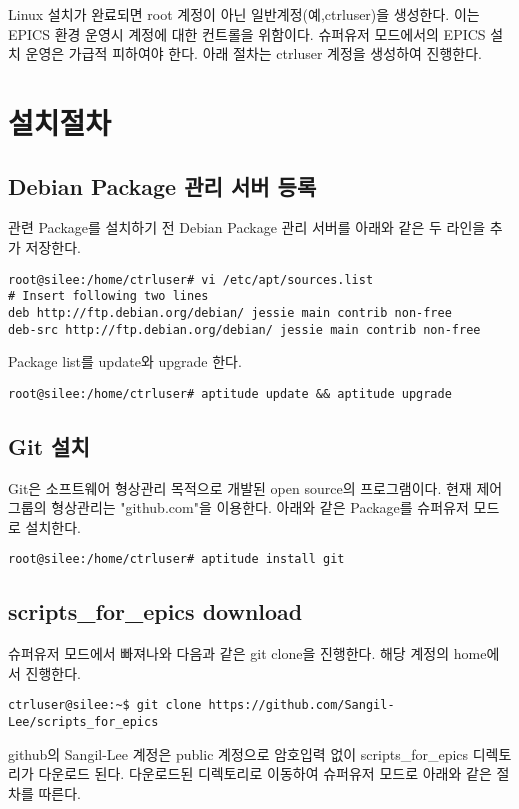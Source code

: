 \documentclass[11pt
  , a4paper
  , article
  , oneside
]{memoir}
\begin{document}
Linux 설치가 완료되면 root 계정이 아닌 일반계정(예,ctrluser)을 생성한다. 이는 EPICS 환경 운영시 계정에 대한 컨트롤을 위함이다. 슈퍼유저 모드에서의 EPICS 설치 운영은 가급적 피하여야 한다. 아래 절차는 ctrluser 계정을 생성하여 진행한다.

\section{설치절차}
\subsection{Debian Package 관리 서버 등록}
관련 Package를 설치하기 전 Debian Package 관리 서버를 아래와 같은 두 라인을 추가 저장한다.
\begin{lstlisting}[style=termstyle]
root@silee:/home/ctrluser# vi /etc/apt/sources.list
# Insert following two lines
deb http://ftp.debian.org/debian/ jessie main contrib non-free
deb-src http://ftp.debian.org/debian/ jessie main contrib non-free
\end{lstlisting}

Package list를 update와 upgrade 한다.
\begin{lstlisting}[style=termstyle]
root@silee:/home/ctrluser# aptitude update && aptitude upgrade
\end{lstlisting}

\subsection{Git 설치}
Git은 소프트웨어 형상관리 목적으로 개발된 open source의 프로그램이다. 현재 제어그룹의 형상관리는 "github.com"\cite{github}을 이용한다. 아래와 같은 Package를 슈퍼유저 모드로 설치한다.

\begin{lstlisting}[style=termstyle]
root@silee:/home/ctrluser# aptitude install git
\end{lstlisting}

\subsection{scripts\_for\_epics download}
슈퍼유저 모드에서 빠져나와 다음과 같은 git clone을 진행한다. 해당 계정의 home에서 진행한다.
\begin{lstlisting}[style=termstyle]
ctrluser@silee:~$ git clone https://github.com/Sangil-Lee/scripts_for_epics
\end{lstlisting}
github의 Sangil-Lee\cite{github_sangil} 계정은 public 계정으로 암호입력 없이 scripts\_for\_epics 디렉토리가 다운로드 된다. 다운로드된 디렉토리로 이동하여 슈퍼유저 모드로 아래와 같은 절차를 따른다. 
\end{document}
